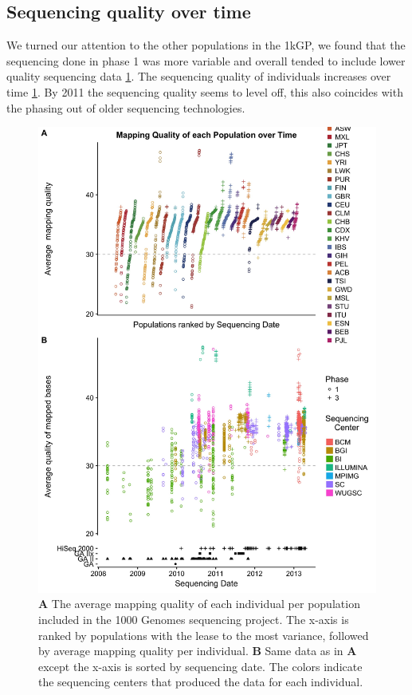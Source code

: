 \documentclass[9pt,lineno]{elife}
\begin{document}
	\subsection{Sequencing quality over time}
We turned our attention to the other populations in the 1kGP, we found that the sequencing done in phase 1 was more variable and overall tended to include lower quality sequencing data \ref{MapQual}.
The sequencing quality of individuals increases over time \ref{MapQual}. 
By 2011 the sequencing quality seems to level off, this also coincides with the phasing out of older sequencing technologies. 
\begin{figure}
\includegraphics[width=\hsize,keepaspectratio]{MapQualOverTime.jpg}

\caption{\textbf{A} The average mapping quality of each individual per population included in the 1000 Genomes sequencing project. The x-axis is ranked by populations with the lease to the most variance, followed by average mapping quality per individual. \textbf{B} Same data as in \textbf{A} except the x-axis is sorted by sequencing date. The colors indicate the sequencing centers that produced the data for each individual.}
\label{MapQual}
\end{figure}
\end{document}
